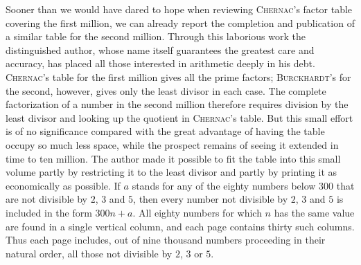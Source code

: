 Sooner than we would have dared to hope when reviewing \textsc{Chernac}'s factor table covering the first million, we can already report the completion and publication of a similar table for the second million. Through this laborious work the distinguished author, whose name itself guarantees the greatest care and accuracy, has placed all those interested in arithmetic deeply in his debt. \textsc{Chernac}'s table for the first million gives all the prime factors; \textsc{Burckhardt}'s for the second, however, gives only the least divisor in each case. The complete factorization of a number in the second million therefore requires division by the least divisor and looking up the quotient in \textsc{Chernac}'s table. But this small effort is of no significance compared with the great advantage of having the table occupy so much less space, while the prospect remains of seeing it extended in time to ten million. The author made it possible to fit the table into this small volume partly by restricting it to the least divisor and partly by printing it as economically as possible. If $a$ stands for any of the eighty numbers below $300$ that are not divisible by $2$, $3$ and $5$, then every number not divisible by $2$, $3$ and $5$ is included in the form $300n+a$. All eighty numbers for which $n$ has the same value are found in a single vertical column, and each page contains thirty such columns. Thus each page includes, out of nine thousand numbers proceeding in their natural order, all those not divisible by $2$, $3$ or $5$.

